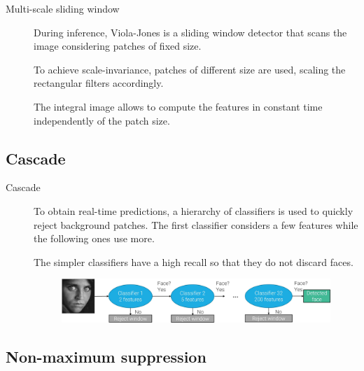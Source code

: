 \begin{description}
    \item[Multi-scale sliding window] 
        During inference, Viola-Jones is a sliding window detector that scans the image considering patches of fixed size.

        To achieve scale-invariance, patches of different size are used, scaling the rectangular filters accordingly.

        \begin{remark}
            The integral image allows to compute the features in constant time independently of the patch size.
        \end{remark}
\end{description}


\subsection{Cascade}

\begin{description}
    \item[Cascade] 
        To obtain real-time predictions, a hierarchy of classifiers is used to quickly reject background patches. The first classifier considers a few features while the following ones use more.

        \begin{remark}
            The simpler classifiers have a high recall so that they do not discard faces.
        \end{remark}

        \begin{figure}[H]
            \centering
            \includegraphics[width=0.8\linewidth]{./img/_viola_jones_cascade.jpg}
        \end{figure}
\end{description}


\subsection{Non-maximum suppression}

